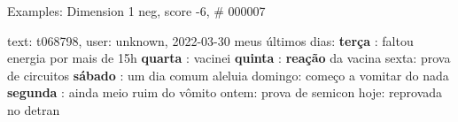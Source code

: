 \begin{frame}{Examples: Dimension 1 neg, score -6, \# 000007}
\footnotesize
\begin{alertblock}{text: t068798, user: unknown, 2022-03-30}
meus últimos dias: \textbf{terça} : faltou energia por mais de 15h 
\textbf{quarta} : vacinei \textbf{quinta} : \textbf{reação} da vacina sexta: 
prova de circuitos \textbf{sábado} : um dia comum aleluia domingo: começo a 
vomitar do nada \textbf{segunda} : ainda meio ruim do vômito ontem: prova de 
semicon hoje: reprovada no detran  
\end{alertblock}
\end{frame}
